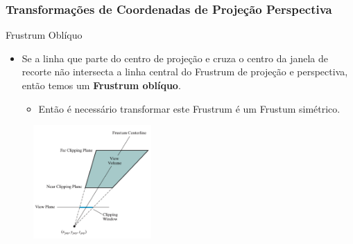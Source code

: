 \documentclass{beamer}
\begin{document}
\begin{frame}
\frametitle{Transformações de Coordenadas de Projeção Perspectiva}
	\begin{block}{Frustrum Oblíquo}
		\begin{itemize}
			\item Se a linha que parte do centro de projeção  e cruza o centro da janela de recorte  não intersecta a linha central do Frustrum de projeção e perspectiva, então temos um \textbf{Frustrum oblíquo}.
			\begin{itemize}
				\item Então é necessário transformar este Frustrum é um Frustum simétrico.
			\end{itemize}
		\end{itemize}	
	\end{block}
	
		\begin{figure}[!h]
			\begin{center}
			\includegraphics[width=0.4\textwidth]{Figures/FruObl}
			\end{center}
	\end{figure}
\end{frame}
\end{document}

